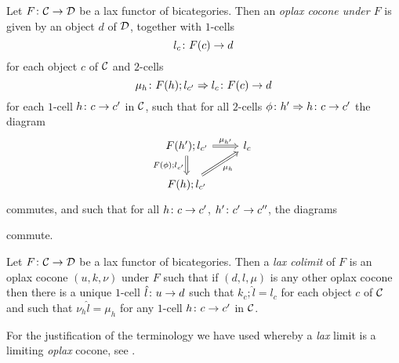 \documentclass{article}
\begin{document}
\begin{definition}
  Let $F \colon {\mathcal{C}} \to {\mathcal{D}}$ be a lax functor of bicategories.  
  Then an \emph{oplax cocone under $F$} is given by an object $d$ of ${\mathcal{D}}$, together with $1$-cells
  \[
    l_c \colon F(c) \to d
    \]
  for each object $c$ of ${\mathcal{C}}$ and $2$-cells
  \[
    \mu_h \colon F(h);l_{c'} \Rightarrow l_c \colon F(c) \to d
    \]
  for each $1$-cell $h\colon c \to c'$ in ${\mathcal{C}}$, such that for all $2$-cells $\phi\colon h' \Rightarrow h \colon c \to c'$ the diagram
  \[
    \begin{tikzcd}
      F(h');l_{c'} \arrow[r, "\mu_{h'}", Rightarrow] \arrow[d, "F(\phi);l_{c'}"', Rightarrow]
        & l_c \\
      F(h);l_{c'} \arrow[ur, "\mu_h"', Rightarrow]
        &
    \end{tikzcd}
    \]
  commutes, and such that for all $h\colon c \to c'$, $h' \colon c' \to c''$, the diagrams
  commute.
\end{definition}

\begin{definition}
  Let $F \colon {\mathcal{C}} \to {\mathcal{D}}$ be a lax functor of bicategories.  
  Then a \emph{lax colimit} of $F$ is an oplax cocone $(u,k,\nu)$ under $F$ such that if $(d,l,\mu)$ is any other oplax cocone then there is a unique $1$-cell $\hat{l} \colon u \to d$ such that $k_c;\hat{l}=l_c$ for each object $c$ of ${\mathcal{C}}$ and such that $\nu_h\hat{l}=\mu_h$ for any $1$-cell $h\colon c \to c'$ in ${\mathcal{C}}$.
\end{definition}

For the justification of the terminology we have used whereby a \emph{lax} limit is a limiting \emph{oplax} cocone, see \cite{nlab:2-limit}.
\end{document}
